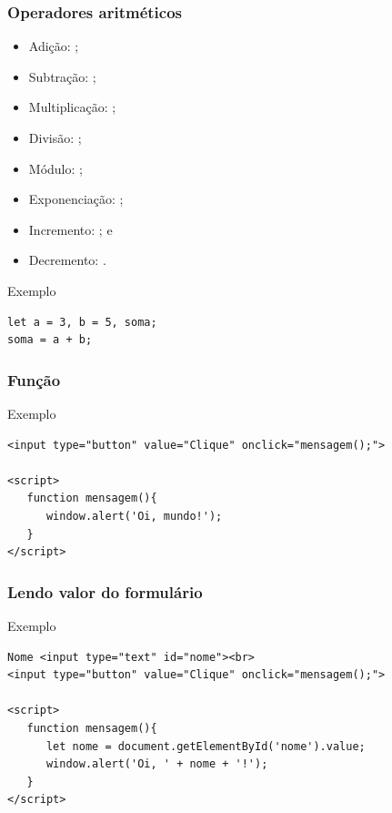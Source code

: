\documentclass[aspectratio=169]{beamer} %
\begin{document}
\begin{frame}[fragile]
	\frametitle{Operadores aritméticos}
	
	\begin{itemize}
		\item Adição: \structure{+};
		\item Subtração: \structure{-};
		\item Multiplicação: \structure{*}; 
		\item Divisão: \structure{/};
		\item Módulo: \structure{\%};
		\item Exponenciação:  \structure{**};
		\item Incremento: \structure{++}; e
		\item Decremento: \structure{- -}.
	\end{itemize}\vfill
	
	\begin{exampleblock}{Exemplo}
		\begin{lstlisting}
let a = 3, b = 5, soma;
soma = a + b;
		\end{lstlisting}
	\end{exampleblock}
\end{frame}

\begin{frame}[fragile]
	\frametitle{Função}
	
	\begin{exampleblock}{Exemplo}
		\begin{lstlisting}
<input type="button" value="Clique" onclick="mensagem();">

<script>
   function mensagem(){
      window.alert('Oi, mundo!');
   }
</script>
		\end{lstlisting}
	\end{exampleblock}
\end{frame}

\begin{frame}[fragile]
	\frametitle{Lendo valor do formulário}
	
	\begin{exampleblock}{Exemplo}
		\begin{lstlisting}
Nome <input type="text" id="nome"><br>
<input type="button" value="Clique" onclick="mensagem();">

<script>
   function mensagem(){
      let nome = document.getElementById('nome').value;
      window.alert('Oi, ' + nome + '!');
   }
</script>
		\end{lstlisting}
	\end{exampleblock}
\end{frame}
\end{document}
